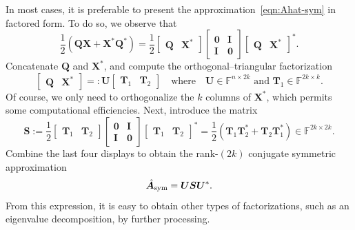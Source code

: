\documentclass[final]{siamart1116}
\numberwithin{equation}{section}
\numberwithin{theorem}{section}
\numberwithin{figure}{section}
\newcommand{\F}{\mathbb{F}}
\newcommand{\mtx}[1]{\bm{#1}}
\newcommand{\Id}{\mathbf{I}}
\begin{document}
In most cases, it is preferable to present the approximation~\cref{eqn:Ahat-sym}
in factored form.  To do so, we observe that
$$
\frac{1}{2}(\mtx{QX} + \mtx{X}^* \mtx{Q}^*) = \frac{1}{2}
	\begin{bmatrix} \mtx{Q} & \mtx{X}^* \end{bmatrix}
	\begin{bmatrix} \mtx{0} & \Id \\ \Id & \mtx{0} \end{bmatrix}
	\begin{bmatrix} \mtx{Q} & \mtx{X}^* \end{bmatrix}^*.
$$
Concatenate $\mtx{Q}$ and $\mtx{X}^*$,
and compute the orthogonal--triangular factorization
\begin{equation} \label{eqn:qx-qr}
\begin{bmatrix} \mtx{Q} & \mtx{X}^* \end{bmatrix}
=: \mtx{U} \begin{bmatrix} \mtx{T}_1 & \mtx{T}_2 \end{bmatrix}
\quad\text{where}\quad
\mtx{U} \in \F^{n \times 2k}
\text{ and }
\mtx{T}_1 \in \F^{2k \times k}.
\end{equation}
Of course, we only need to orthogonalize the $k$ columns of $\mtx{X}^*$,
which permits some computational efficiencies.
Next, introduce the matrix
\begin{equation} \label{eqn:def-S}
\mtx{S} := \frac{1}{2} \begin{bmatrix} \mtx{T}_1 & \mtx{T}_2 \end{bmatrix}
	\begin{bmatrix} \mtx{0} & \Id \\ \Id & \mtx{0} \end{bmatrix}
	\begin{bmatrix} \mtx{T}_1 & \mtx{T}_2 \end{bmatrix}^*
	= \frac{1}{2}( \mtx{T}_1 \mtx{T}_2^* + \mtx{T}_2 \mtx{T}_1^* )
	\in \F^{2k \times 2k}.
\end{equation}
Combine the last four displays to obtain the rank-$(2k)$ conjugate symmetric approximation
\begin{equation} \label{eqn:Ahat-sym-factored}
\hat{\mtx{A}}_{\rm sym} 	= \mtx{USU}^*.
\end{equation}
From this expression, it is easy to obtain other types of factorizations,
such as an eigenvalue decomposition, by further processing. 
\end{document}
